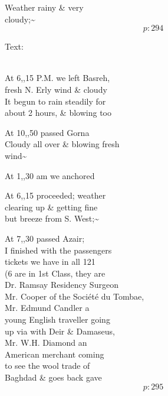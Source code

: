 \documentclass{report}
\begin{document}
	\par{
 	Weather rainy \& very\ \\cloudy;\~{}\ \\
  \[p: 294 \]

	}








	\par{
 	Text:\ \\\ \\
	}

	\par{
 	At 6,,15 P.M. we left Basreh,\ \\fresh N. Erly wind \& cloudy\ \\It begun to rain steadily for\ \\about 2 hours, \& blowing too\ \\
	}

	\par{
 	At 10,,50 passed Gorna\ \\Cloudy all over \& blowing fresh\ \\wind\~{}\ \\
	}

	\par{
 	At 1,,30 am we anchored\ \\
	}

	\par{
 	At 6,,15 proceeded; weather\ \\clearing up \& getting fine\ \\but breeze from S. West;\~{}\ \\
	}

	\par{
 	At 7,,30 passed Azair;\ \\I finished with the passengers\ \\tickets we have in all 121\ \\(6 are in 1st Class, they are\ \\Dr. Ramsay Residency Surgeon\ \\Mr. Cooper of the Société du Tombae,\ \\Mr. Edmund Candler a\ \\young English traveller going\ \\up via with Deir \& Damaseus,\ \\Mr. W.H. Diamond an\ \\American merchant coming\ \\to see the wool trade of\ \\Baghdad \& goes back gave\ \\
  \[p: 295 \]

	}
\end{document}
